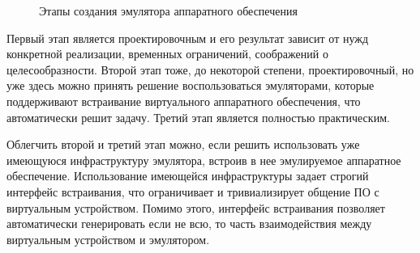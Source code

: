 \begin{figure}[!htbp]
    \centering
    \caption{Этапы создания эмулятора аппаратного обеспечения}\label{fig:emu-creation-naive}
\end{figure}


Первый этап является проектировочным и его результат зависит от нужд конкретной реализации, временных ограничений,
соображений о целесообразности.
Второй этап тоже, до некоторой степени, проектировочный, но уже здесь можно принять решение
воспользоваться эмуляторами, которые поддерживают встраивание виртуального аппаратного обеспечения,
что автоматически решит задачу.
Третий этап является полностью практическим.

Облегчить второй и третий этап можно, если решить использовать уже имеющуюся инфраструктуру эмулятора,
встроив в нее эмулируемое аппаратное обеспечение.
Использование имеющейся инфраструктуры задает строгий интерфейс встраивания, что ограничивает и тривиализирует
общение ПО с виртуальным устройством.
Помимо этого, интерфейс встраивания позволяет автоматически генерировать если не всю, то часть взаимодействия
между виртуальным устройством и эмулятором.


